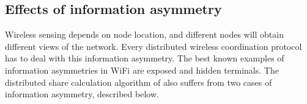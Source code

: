 \subsection{Effects of information asymmetry}
\label{sec:asymmetry}


Wireless sensing depends on node location, and different nodes will obtain different views of the network. 
Every distributed wireless coordination protocol has to deal with this information asymmetry. 
The best known examples of information asymmetries in WiFi are exposed and hidden terminals. 
The distributed share calculation algorithm of \cf also suffers from two cases of information asymmetry, 
described below. 





